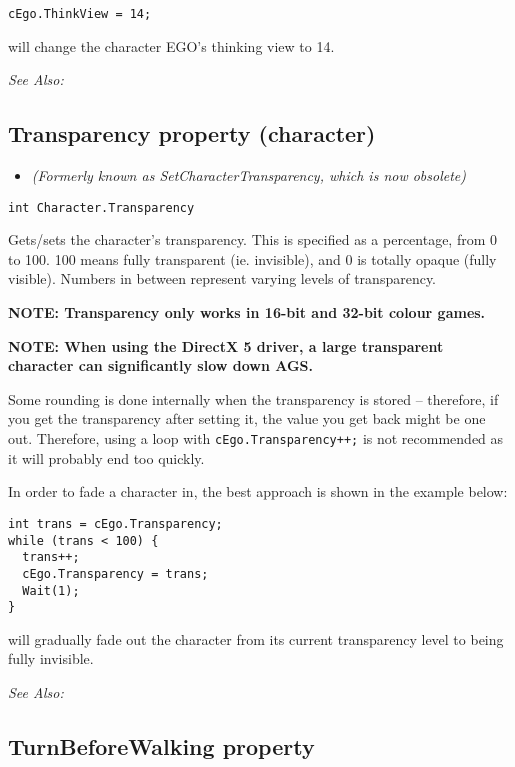 \begin{verbatim}
cEgo.ThinkView = 14;
\end{verbatim}
will change the character EGO's thinking view to 14.

\it{See Also:} 


\subsection{Transparency property (character)}\label{Character.Transparency}%

\begin{itemize}
\item \it{(Formerly known as SetCharacterTransparency, which is now obsolete)}
\end{itemize}

\begin{verbatim}
int Character.Transparency
\end{verbatim}
Gets/sets the character's transparency. This is specified as a percentage, from 0 to 100.
100 means fully transparent (ie. invisible), and 0 is totally opaque (fully visible). Numbers
in between represent varying levels of transparency.

\bf{NOTE:} Transparency only works in 16-bit and 32-bit colour games.

\bf{NOTE:} When using the DirectX 5 driver, a large transparent character can significantly slow
down AGS.

Some rounding is done internally when the transparency is stored -- therefore, if you get
the transparency after setting it, the value you get back might be one out. Therefore, using
a loop with \verb$cEgo.Transparency++;$ is not recommended as it will probably
end too quickly.

In order to fade a character in, the best approach is shown in the example below:

\begin{verbatim}
int trans = cEgo.Transparency;
while (trans < 100) {
  trans++;
  cEgo.Transparency = trans;
  Wait(1);
}
\end{verbatim}
will gradually fade out the character from its current transparency level to being fully
invisible.

\it{See Also:} 


\subsection{TurnBeforeWalking property}\label{Character.TurnBeforeWalking}%


